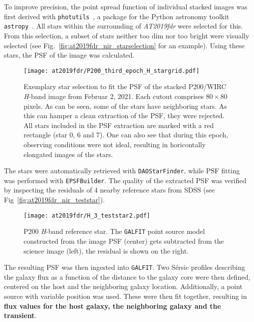 To improve precision, the point spread function of individual stacked images was first derived with \texttt{photutils}~, a package for the Python astronomy toolkit \texttt{astropy}~. All stars within the surrounding of \emph{AT2019fdr} were selected for this. From this selection, a subset of stars neither too dim nor too bright were visually selected (see Fig.~\ref{fig:at2019fdr_nir_starselection} for an example). Using these stars, the PSF of the image was calculated.

\begin{figure*}[htb]
    \texttt{[image: at2019fdr/P200\_third\_epoch\_H\_stargrid.pdf]}
    \caption[P200 \textit{H}-band star selection]{Exemplary star selection to fit the PSF of the stacked P200/WIRC \textit{H}-band image from Februar 2, 2021. Each cutout comprises $80\times80$ pixels. As can be seen, some of the stars have neighboring stars. As this can hamper a clean extraction of the PSF, they were rejected. All stars included in the PSF extraction are marked with a red rectangle (star 0, 6 and 7). One can also see that during this epoch, observing conditions were not ideal, resulting in horicontally elongated images of the stars.}
\end{figure*}

The stars were automatically retrieved with \texttt{DAOStarFinder}, while PSF fitting was performed with \texttt{EPSFBuilder}. The quality of the extracted PSF was verified by inspecting the residuals of 4 nearby reference stars from SDSS (see Fig~\ref{fig:at2019fdr_nir_teststar}).

\begin{figure}[htb]
    \texttt{[image: at2019fdr/H\_3\_teststar2.pdf]}
    \caption[P200 \textit{H}-band reference star]{P200 \textit{H}-band reference star. The \texttt{GALFIT} point source model constructed from the image PSF (center) gets subtracted from the science image (left), the residual is shown on the right.}
\end{figure}

The resulting PSF was then ingested into \texttt{GALFIT}. Two Sérsic  profiles describing the galaxy flux as a function of the distance to the galaxy core were then defined, centered on the host and the neighboring galaxy location. Additionally, a point source with variable position was used. These were then fit together, resulting in \textbf{flux values for the host galaxy, the neighboring galaxy and the transient}.

